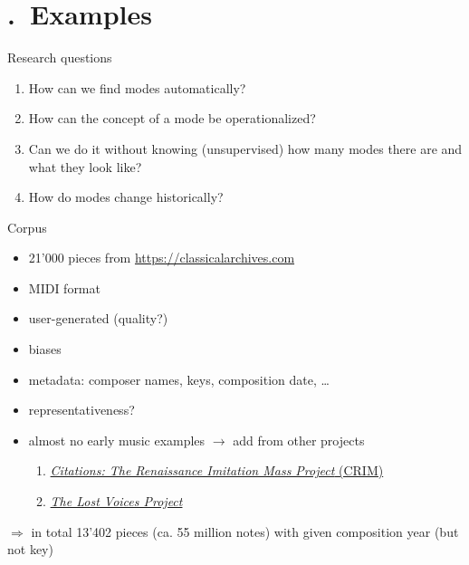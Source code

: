 \section{\thesection.~Examples}

\begin{frame}{}
\end{frame}

\begin{frame}{Research questions}
    \begin{enumerate}
        \item How can we find modes \alert{automatically}? 
        \item How can the concept of a \alert{mode} be operationalized? 
        \item Can we do it without knowing (\alert{unsupervised}) how many modes there are and what they look like?
        \item How do modes change \alert{historically}?
    \end{enumerate}
\end{frame}

\begin{frame}{Corpus}
    \begin{itemize}
        \item 21'000 pieces from \url{https://classicalarchives.com}
        \item MIDI format
        \item user-generated (quality?)
        \item biases
        \item metadata: composer names, keys, composition date, \ldots 
        \item representativeness?
        \item almost no early music examples $\longrightarrow$ add from other projects
        \begin{enumerate}
            \item \href{http://crimproject.org/}{\emph{Citations: The Renaissance Imitation Mass Project} (CRIM)}
            \item \href{http://digitalduchemin.org/}{\emph{The Lost Voices Project}}
        \end{enumerate}
    \end{itemize}
    \pause
    $\Longrightarrow$ in total 13'402 pieces (ca. 55 million notes) with given composition year (but not key)
\end{frame}

